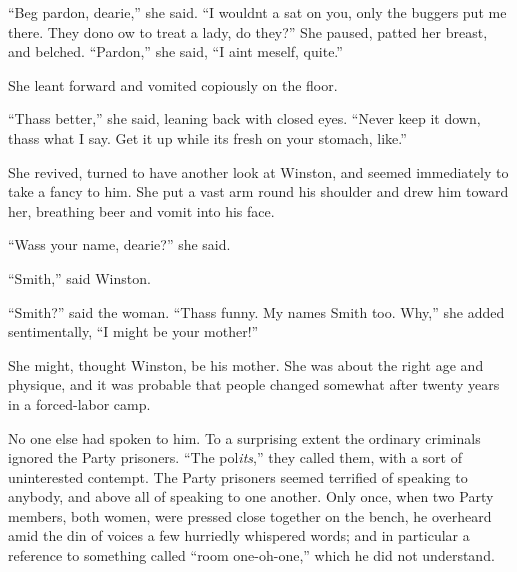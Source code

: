 ``Beg pardon, dearie,'' she said. ``I wouldn\textquotesingle t
\textquotesingle a sat on you, only the buggers put me there. They dono
\textquotesingle ow to treat a lady, do they?'' She paused, patted her
breast, and belched. ``Pardon,'' she said, ``I ain\textquotesingle t
meself, quite.''

She leant forward and vomited copiously on the floor.

``Thass better,'' she said, leaning back with closed eyes. ``Never keep it
down, thass what I say. Get it up while it\textquotesingle s fresh on
your stomach, like.''

She revived, turned to have another look at Winston, and seemed
immediately to take a fancy to him. She put a vast arm round his
shoulder and drew him toward her, breathing beer and vomit into his
face.

``Wass your name, dearie?'' she said.

``Smith,'' said Winston.

``Smith?'' said the woman. ``Thass funny. My name\textquotesingle s Smith
too. Why,'' she added sentimentally, ``I might be your mother!''

She might, thought Winston, be his mother. She was about the right age
and physique, and it was probable that people changed somewhat after
twenty years in a forced-labor camp.

No one else had spoken to him. To a surprising extent the ordinary
criminals ignored the Party prisoners. ``The pol\emph{its},'' they called
them, with a sort of uninterested contempt. The Party prisoners seemed
terrified of speaking to anybody, and above all of speaking to one
another. Only once, when two Party members, both women, were pressed
close together on the bench, he overheard amid the din of voices a few
hurriedly whispered words; and in particular a reference to something
called ``room one-oh-one,'' which he did not understand.

